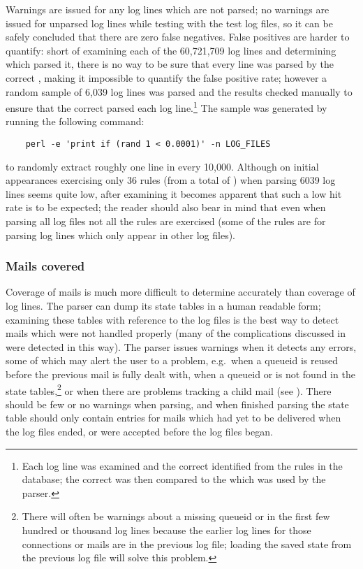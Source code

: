 Warnings are issued for any log lines which are not parsed; no warnings are
issued for unparsed log lines while testing with the \numberOFlogFILES{}
test log files, so it can be safely concluded that there are zero false
negatives.  False positives are harder to quantify: short of examining each
of the 60,721,709 log lines and determining which \regex{} parsed it, there
is no way to be sure that every line was parsed by the correct \regex{},
making it impossible to quantify the false positive rate; however a random
sample of 6,039 log lines was parsed and the results checked manually to
ensure that the correct \regex{} parsed each log line.\footnote{Each log
line was examined and the correct \regex{} identified from the
\numberOFrules{} rules in the database; the correct \regex{} was then
compared to the \regex{} which was used by the parser.}  The sample was
generated by running the following command:

\verb!    perl -e 'print if (rand 1 < 0.0001)' -n LOG_FILES!

\noindent{}to randomly extract roughly one line in every 10,000.  Although
on initial appearances exercising only 36 rules (from a total of
\numberOFrules{}) when parsing 6039 log lines seems quite low, after
examining  it becomes apparent that such
a low hit rate is to be expected; the reader should also bear in mind that
even when parsing all \numberOFlogFILES{} log files not all the rules are
exercised (some of the rules are for parsing log lines which only appear in
other log files).

\subsubsection{Mails covered}

\label{mails-covered}

Coverage of mails is much more difficult to determine accurately than
coverage of log lines.  The parser can dump its state tables in a human
readable form; examining these tables with reference to the log files is
the best way to detect mails which were not handled properly (many of the
complications discussed in  were
detected in this way).  The parser issues warnings when it detects any
errors, some of which may alert the user to a problem, e.g.\ when a queueid
is reused before the previous mail is fully dealt with, when a queueid or
\pid{} is not found in the state tables,\footnote{There will often be
warnings about a missing queueid or \pid{} in the first few hundred or
thousand log lines because the earlier log lines for those connections or
mails are in the previous log file; loading the saved state from the
previous log file will solve this problem.} or when there are problems
tracking a child mail (see ).  There
should be few or no warnings when parsing, and when finished parsing the
state table should only contain entries for mails which had yet to be
delivered when the log files ended, or were accepted before the log files
began.

